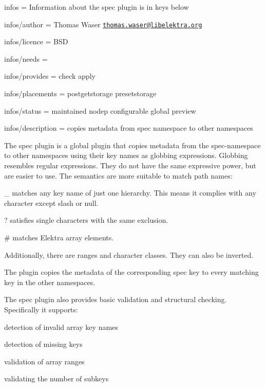 
\begin{DoxyItemize}
\item infos = Information about the spec plugin is in keys below
\item infos/author = Thomas Waser \href{mailto:thomas.waser@libelektra.org}{\tt thomas.\+waser@libelektra.\+org}
\item infos/licence = B\+SD
\item infos/needs =
\item infos/provides = check apply
\item infos/placements = postgetstorage presetstorage
\item infos/status = maintained nodep configurable global preview
\item infos/description = copies metadata from spec namespace to other namespaces
\end{DoxyItemize}

The spec plugin is a global plugin that copies metadata from the {\ttfamily spec}-\/namespace to other namespaces using their key names as globbing expressions. Globbing resembles regular expressions. They do not have the same expressive power, but are easier to use. The semantics are more suitable to match path names\+:


\begin{DoxyItemize}
\item \+\_\+ matches any key name of just one hierarchy. This means it complies with any character except slash or null.
\item ? satisfies single characters with the same exclusion.
\item \# matches Elektra array elements.
\item Additionally, there are ranges and character classes. They can also be inverted.
\end{DoxyItemize}

The plugin copies the metadata of the corresponding {\ttfamily spec} key to every matching key in the other namespaces.

The spec plugin also provides basic validation and structural checking. Specifically it supports\+:


\begin{DoxyItemize}
\item detection of invalid array key names
\item detection of missing keys
\item validation of array ranges
\item validating the number of subkeys
\end{DoxyItemize}

